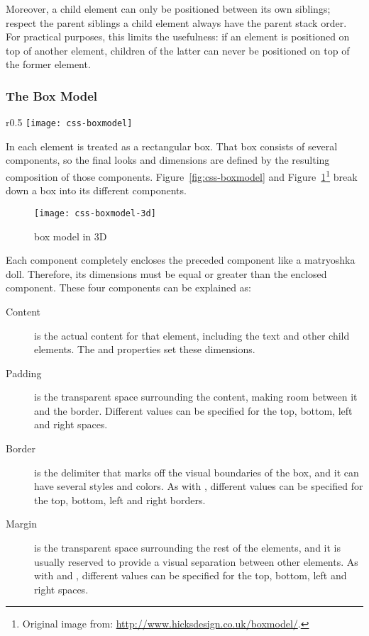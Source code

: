 Moreover, a child element can only be positioned between its own siblings; respect the parent siblings a child element always have the parent stack order.
For practical purposes, this limits the  usefulness: if an element is positioned on top of another element, children of the latter can never be positioned on top of the former element.


\subsubsection{The Box Model} %
\label{ssub:boxmodel}

\begin{wrapfigure}{r}{0.5\textwidth}
  \centering
    \texttt{[image: css-boxmodel]}
  \caption{ box model}
  \label{fig:css-boxmodel}
\end{wrapfigure}

In  each element is treated as a rectangular box.
That box consists of several components, so the final looks and dimensions are defined by the resulting composition of those components.
Figure~\ref{fig:css-boxmodel} and Figure~\ref{fig:css-boxmodel-3d}\footnote{Original image from: \url{http://www.hicksdesign.co.uk/boxmodel/}.} break down a box into its different components.

\begin{figure}[htbp]
  \centering
    \texttt{[image: css-boxmodel-3d]}
  \caption{ box model in 3D}
  \label{fig:css-boxmodel-3d}
\end{figure}

Each component completely encloses the preceded component like a matryoshka doll.
Therefore, its dimensions must be equal or greater than the enclosed component.
These four components can be explained as:

\begin{description}
  \item[Content] is the actual content for that element, including the text and other child elements.
  The  and   properties set these dimensions.
  \item[Padding] is the transparent space surrounding the content, making room between it and the border.
  Different values can be specified for the top, bottom, left and right spaces.
  \item[Border] is the delimiter that marks off the visual boundaries of the box, and it can have several styles and colors.
  As with , different values can be specified for the top, bottom, left and right borders.
  \item[Margin] is the transparent space surrounding the rest of the elements, and it is usually reserved to provide a visual separation between other elements.
  As with  and , different values can be specified for the top, bottom, left and right spaces.
\end{description}

